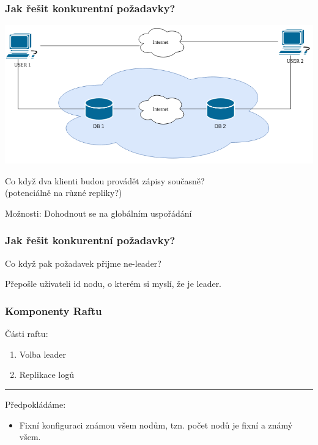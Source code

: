 \documentclass[usenames,dvipsnames,9pt]{beamer}
\begin{document}
\begin{frame}
  \frametitle{Jak řešit konkurentní požadavky?}

  \begin{center}
    \includegraphics[width=0.8\linewidth]{12/figs/pdv_cloud.png}

    \vspace{2em}

    {\Large Co když dva klienti budou provádět zápisy současně?} \\
    (potenciálně na různé repliky?)
  \end{center}

  Možnosti: \hspace{10pt} Dohodnout se na globálním uspořádání

  \pause
  \hspace{50pt}           %
\end{frame}

\begin{frame}
  \frametitle{Jak řešit konkurentní požadavky?}
  \begin{center}
    \Large Co když pak požadavek přijme ne-leader?
    \pause

    Přepošle uživateli id nodu, o kterém si myslí, že je leader.
  \end{center}
\end{frame}

\begin{frame}
  \frametitle{Komponenty Raftu}
  {\Large Části raftu:}
    \begin{enumerate}
      \item Volba leader
      \item Replikace logů
    \end{enumerate}
  \pause

  \vspace{2em}\hrule\vspace{2em}

  {\Large Předpokládáme:}

  \begin{itemize}
    \item Fixní konfiguraci známou všem nodům, tzn. počet nodů je fixní a známý všem.
  \end{itemize}
\end{frame}
\end{document}
